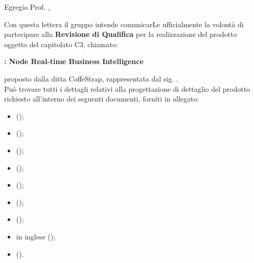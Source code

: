 \documentclass{letter}
\begin{document}
\begin{letter}{}

	\vspace{4cm}
	
	\opening{Egregio Prof. \committente{},}
	
	Con questa lettera il gruppo \groupname{} intende comunicarLe ufficialmente la volontà di partecipare alla \textbf{Revisione di Qualifica} per la realizzazione del prodotto oggetto del capitolato C3, chiamato:
	\begin{center}
		\textbf{\projectname{}: Node Real-time Business Intelligence}
	\end{center}
	proposto dalla ditta CoffeStrap, rappresentata dal sig. \proponente{}.\\
	Può trovare tutti i dettagli relativi alla progettazione di dettaglio del prodotto richiesto all'interno dei seguenti documenti, forniti in allegato:

	\begin{itemize}
		\item {} ();
		\item {} ();
		\item {} ();
		\item {} ();
		\item {} ();
		\item {} ();
		\item {} ();
		\item {} in inglese ();
		\item {} ().
	\end{itemize}
	

\end{letter}
\end{document}

